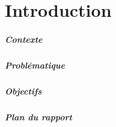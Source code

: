 \chapter*{Introduction}


\paragraph{Contexte}

\paragraph{Problématique}

\paragraph{Objectifs}

\paragraph{Plan du rapport}
